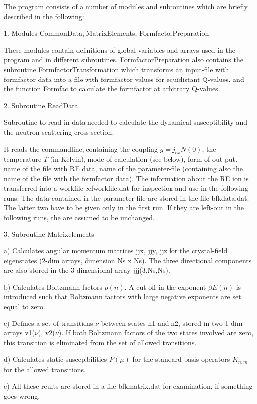    
The program consists of a number of modules and subroutines which are
briefly described in the following: 
 
1. Modules CommonData, MatrixElements, FormfactorPreparation

These modules contain definitions of global variables and arrays 
used in the program and in different  subroutines. 
FormfactorPreparation also contains the
subroutine FormfactorTransformation which transforms an input-file with
formfactor data into a file with formfactor values for equidistant Q-values. 
and the function Formfac to calculate the formfactor at
arbitrary Q-values.
  
2. Subroutine ReadData

Subroutine to read-in data needed to calculate the dynamical susceptibility
and the neutron scattering cross-section.

It reads the commandline, containing the coupling $g=j_{ex} N(0)$,  
the temperature  $T$ (in Kelvin), mode of calculation (see below), form of out-put, 
name of the
file with RE data, name of the parameter-file (containing also the name of
the file with the formfactor data). The information about the RE ion is
transferred into a workfile cefworkfile.dat for inspection and use in the
following runs. The data contained in the parameter-file are stored in the
file bfkdata.dat. The latter two have to be given only in the first run. If
they are left-out  in the following runs, the are assumed    to be
unchanged.

3. Subroutine Matrixelements

a) Calculates angular momentum matrices jjx, jjy, jjz for the crystal-field eigenstates
(2-dim arrays, dimension Ns x Ns). The three directional components are also
stored in the 3-dimensional array jjj(3,Ns,Ns). 

b) Calculates Boltzmann-factors $p(n)$. A cut-off in the exponent $\beta
E(n)$ is introduced such that Boltzmann factors with large negative
exponents
are set equal to zero. 

c) Defines  a set of transitions  $\nu$  between states
n1 and n2, stored in two  1-dim
arrays v1($\nu$), v2($\nu$). If both Boltzmann factors of the two states
involved are zero, this transition is eliminated from the set of allowed
transitions.  

d) Calculates static suscepibilities $P(\mu)$ for the standard basis operators
$K_{n,m}$ for the allowed transitions.  

e) All these reults are stored in a  file bfkmatrix.dat for examination, if
something goes wrong.
 

